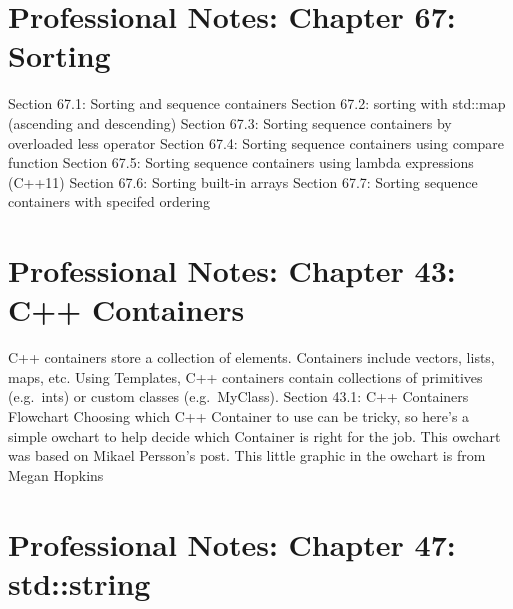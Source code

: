 \hypertarget{professional-notes-chapter-67-sorting}{%
\chapter{Professional Notes: Chapter 67:
Sorting}\label{professional-notes-chapter-67-sorting}}

Section 67.1: Sorting and sequence containers Section 67.2: sorting with
std::map (ascending and descending) Section 67.3: Sorting sequence
containers by overloaded less operator Section 67.4: Sorting sequence
containers using compare function Section 67.5: Sorting sequence
containers using lambda expressions (C++11) Section 67.6: Sorting
built-in arrays Section 67.7: Sorting sequence containers with specifed
ordering

\hypertarget{professional-notes-chapter-43-c-containers}{%
\chapter{Professional Notes: Chapter 43: C++
Containers}\label{professional-notes-chapter-43-c-containers}}

C++ containers store a collection of elements. Containers include
vectors, lists, maps, etc. Using Templates, C++ containers contain
collections of primitives (e.g.~ints) or custom classes (e.g.~MyClass).
Section 43.1: C++ Containers Flowchart Choosing which C++ Container to
use can be tricky, so here's a simple owchart to help decide which
Container is right for the job. This owchart was based on Mikael
Persson's post. This little graphic in the owchart is from Megan Hopkins

\hypertarget{professional-notes-chapter-47-stdstring-1}{%
\chapter{Professional Notes: Chapter 47:
std::string}\label{professional-notes-chapter-47-stdstring-1}}

